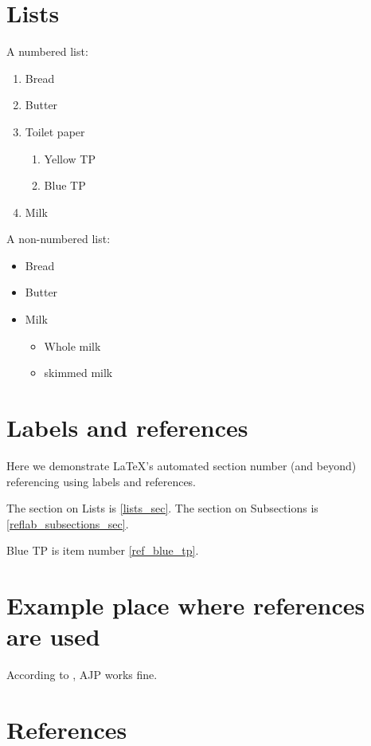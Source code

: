 \documentclass{article}
\begin{document}
  \section{Lists \label{lists_sec}}

    A numbered list:
    \begin{enumerate}
      \item Bread
      \item Butter
      \item Toilet paper
        \begin{enumerate}
          \item Yellow TP
          \item Blue TP \label{ref_blue_tp}
        \end{enumerate}
      \item Milk
    \end{enumerate}

    A non-numbered list:
    \begin{itemize}
      \item Bread
      \item Butter
      \item Milk
        \begin{itemize}
          \item Whole milk 
          \item skimmed milk
        \end{itemize}
    \end{itemize}
  

  \section{Labels and references}

    Here we demonstrate LaTeX's automated section number (and beyond) referencing using labels and references.

    The section on Lists is \ref{lists_sec}. The section on Subsections is \ref{reflab_subsections_sec}.

    Blue TP is item number \ref{ref_blue_tp}. 

  
  \section{Example place where references are used}

  According to \textcite{catic_aerosol-jet_2020}, AJP works fine. 


  \section{References}

    \printbibliography
    
\end{document}
